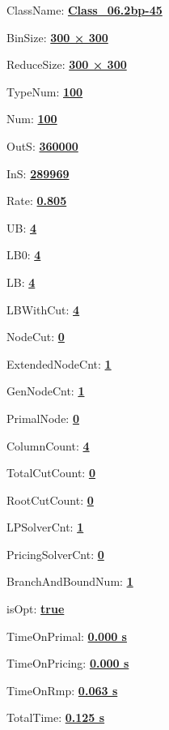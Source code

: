 \documentclass[11pt]{article}
\begin{document}
\pagestyle{empty}


ClassName: \underline{\textbf{Class_06.2bp-45}}
\par
BinSize: \underline{\textbf{300 × 300}}
\par
ReduceSize: \underline{\textbf{300 × 300}}
\par
TypeNum: \underline{\textbf{100}}
\par
Num: \underline{\textbf{100}}
\par
OutS: \underline{\textbf{360000}}
\par
InS: \underline{\textbf{289969}}
\par
Rate: \underline{\textbf{0.805}}
\par
UB: \underline{\textbf{4}}
\par
LB0: \underline{\textbf{4}}
\par
LB: \underline{\textbf{4}}
\par
LBWithCut: \underline{\textbf{4}}
\par
NodeCut: \underline{\textbf{0}}
\par
ExtendedNodeCnt: \underline{\textbf{1}}
\par
GenNodeCnt: \underline{\textbf{1}}
\par
PrimalNode: \underline{\textbf{0}}
\par
ColumnCount: \underline{\textbf{4}}
\par
TotalCutCount: \underline{\textbf{0}}
\par
RootCutCount: \underline{\textbf{0}}
\par
LPSolverCnt: \underline{\textbf{1}}
\par
PricingSolverCnt: \underline{\textbf{0}}
\par
BranchAndBoundNum: \underline{\textbf{1}}
\par
isOpt: \underline{\textbf{true}}
\par
TimeOnPrimal: \underline{\textbf{0.000 s}}
\par
TimeOnPricing: \underline{\textbf{0.000 s}}
\par
TimeOnRmp: \underline{\textbf{0.063 s}}
\par
TotalTime: \underline{\textbf{0.125 s}}
\par
\newpage
\end{document}
